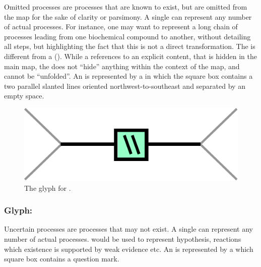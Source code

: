Omitted processes are processes that are known to exist, but are omitted from the map for the sake of clarity or parsimony. A single  can represent any number of actual processes. For instance, one may want to represent a long chain of processes leading from one biochemical compound to another, without detailing all steps, but highlighting the fact that this is not a direct transformation.  The  is different from a  (). While a  references to an explicit content, that is hidden in the main map, the  does not ``hide'' anything within the context of the map, and cannot be ``unfolded''. An  is represented by a  in which the square box contains a two parallel slanted lines oriented northwest-to-southeast and separated by an empty space.

\begin{figure}[htb]
  \centering
  \includegraphics[scale = 0.5]{le_images/omitted}
  \caption{The \PD glyph for .}
  \label{fig:omitted}
\end{figure}



\subsubsection{Glyph: }\label{sec:uncertain}

Uncertain processes are processes that may not exist. A single  can represent any number of actual processes.  would be used to represent hypothesis, reactions which existence is supported by weak evidence etc. An  is represented by a  which square box contains a question mark.

